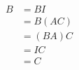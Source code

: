 \setlength{\abovedisplayskip}{-\baselineskip}
\begin{align*}
    B &= BI \\
    &= B(AC) \\
    &= (BA)C \\
    &= IC \\
    &= C
\end{align*}
